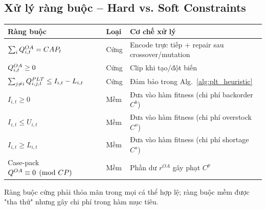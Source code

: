 \subsection{Xử lý ràng buộc -- Hard vs. Soft Constraints}

\begin{center}
\begin{tabular}{p{}p{}p{}}
\toprule
\textbf{Ràng buộc} & \textbf{Loại} & \textbf{Cơ chế xử lý} \\
\midrule
$\sum_i Q^{OA}_{i,t} = CAP_t$ & Cứng & Encode trực tiếp + repair sau crossover/mutation \\
$Q^{OA}_{i,t} \geq 0$ & Cứng & Clip khi tạo/đột biến \\
$\sum_{j \neq i} Q^{PLT}_{i,j,t} \leq I_{i,t} - L_{i,t}$ & Cứng & Đảm bảo trong Alg.~\ref{alg:plt_heuristic} \\
$I_{i,t} \geq 0$ & Mềm & Đưa vào hàm fitness (chi phí backorder $C^b$) \\
$I_{i,t} \leq U_{i,t}$ & Mềm & Đưa vào hàm fitness (chi phí overstock $C^o$) \\
$I_{i,t} \geq L_{i,t}$ & Mềm & Đưa vào hàm fitness (chi phí shortage $C^s$) \\
Case-pack $Q^{OA} \equiv 0 \pmod{CP}$ & Mềm & Phần dư $r^{OA}$ gây phạt $C^p$ \\
\bottomrule
\end{tabular}
\end{center}

\noindent Ràng buộc cứng phải thỏa mãn trong mọi cá thể hợp lệ; ràng buộc mềm được "tha thứ" nhưng gây chi phí trong hàm mục tiêu.
